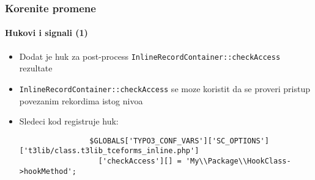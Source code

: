 \begin{frame}[fragile]
	\frametitle{Korenite promene}
	\framesubtitle{Hukovi i signali (1)}

	\lstset{basicstyle=\tiny\ttfamily}

	\begin{itemize}

		\item Dodat je huk za post-process \texttt{InlineRecordContainer::checkAccess} rezultate

		\item \texttt{InlineRecordContainer::checkAccess} se moze koristit da se proveri pristup povezanim rekordima istog nivoa

		\item Sledeci kod registruje huk:

			\begin{lstlisting}
				$GLOBALS['TYPO3_CONF_VARS']['SC_OPTIONS']['t3lib/class.t3lib_tceforms_inline.php']
				  ['checkAccess'][] = 'My\\Package\\HookClass->hookMethod';
			\end{lstlisting}

	\end{itemize}

\end{frame}


